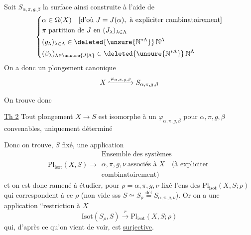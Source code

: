 Soit $S_{\alpha,\pi,g,\beta}$ la surface ainsi construite à l'aide de
\[
 \left\{\begin{aligned}
 &\alpha\in\Omega(X)\quad[\text{d'où }J=J(\alpha),\text{ à expliciter combinatoirement}]\\
 &\pi\text{ partition de }J\text{ en }(J_\lambda)_{\lambda\in\Lambda}\\
 &(g_\lambda)_{\lambda\in\Lambda}\in\deleted{\unsure{\mathbb N^{*\Lambda}}}\,\mathbb N^\Lambda\\
 &(\beta_\lambda)_{\lambda\in\unsure{J|\Lambda}}\in\deleted{\unsure{\mathbb N^{*\Lambda}}}\,\mathbb N^\Lambda
 \end{aligned}\right.
\]
On a donc un plongement canonique
\[
 X\lhook\joinrel\xrightarrow{\varphi_{\alpha,\pi,g,\beta}} S_{\alpha,\pi,g,\beta}
\]

On trouve donc

\uline{Th 2} Tout plongement $X\longrightarrow S$  est isomorphe à un $\varphi_{\alpha,\pi,g,\beta}$ pour $\alpha,\pi,g,\beta$ convenables, uniquement déterminé

Donc on trouve,  $S$ fixé, une application
\[
 \mathrm{Pl}_{\mathrm{isot}}(X,S)\longrightarrow
 \begin{gathered}\text{Ensemble des systèmes}\\
 \alpha,\pi,g,\nu\ \text{associés à }X\quad(\text{à expliciter}\\
 \text{combinatoirement})\end{gathered}
\]
et on est donc ramené à étudier, pour $\rho=\alpha,\pi,g,\nu$ fixé l'ens des $\mathrm{Pl}_{\mathrm{isot}}(X,S;\rho)$ qui correspondent à ce $\rho$ (non vide sss $S\simeq S_\rho\overset{\text{déf}}=S_{\alpha,\pi,g,\nu}$).  Or on a une application  ``restriction à $X$
\[
 \boxed{\mathrm{Isot}(S_\rho,S)\xrightarrow{r}\mathrm{Pl}_{\mathrm{isot}}(X,S;\rho)}
\]
 qui, d'après ce qu'on vient de voir, est \uline{surjective}.


